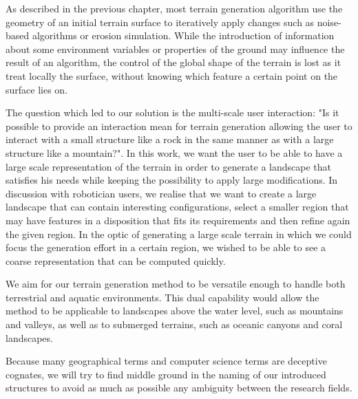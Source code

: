 As described in the previous chapter, most terrain generation algorithm use the geometry of an initial terrain surface to iteratively apply changes such as noise-based algorithms or erosion simulation. While the introduction of information about some environment variables or properties of the ground may influence the result of an algorithm, the control of the global shape of the terrain is lost as it treat locally the surface, without knowing which feature a certain point on the surface lies on.

The question which led to our solution is the multi-scale user interaction: "Is it possible to provide an interaction mean for terrain generation allowing the user to interact with a small structure like a rock in the same manner as with a large structure like a mountain?". 
In this work, we want the user to be able to have a large scale representation of the terrain in order to generate a landscape that satisfies his needs while keeping the possibility to apply large modifications.
In discussion with robotician users, we realise that we want to create a large landscape that can contain interesting configurations, select a smaller region that may have features in a disposition that fits its requirements and then refine again the given region.
In the optic of generating a large scale terrain in which we could focus the generation effort in a certain region, we wished to be able to see a coarse representation that can be computed quickly.

We aim for our terrain generation method to be versatile enough to handle both terrestrial and aquatic environments. This dual capability would allow the method to be applicable to landscapes above the water level, such as mountains and valleys, as well as to submerged terrains, such as oceanic canyons and coral landscapes.

Because many geographical terms and computer science terms are deceptive cognates, we will try to find middle ground in the naming of our introduced structures to avoid as much as possible any ambiguity between the research fields.


